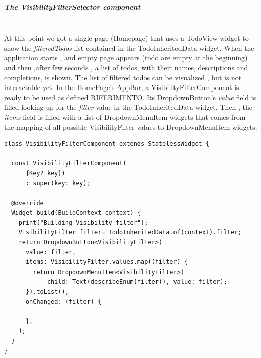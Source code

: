 \subparagraph{The VisibilityFilterSelector component}\mbox{}\\
\label{subpar:todo_app_inherited_widget_visibilityfiltercomponent_component}
At this point we got a single page (Homepage) that uses a TodoView widget to show the \textit{filteredTodos} list contained in the TodoInheritedData widget. When the application starts , and empty page appears (todo are empty at the beginning) and then ,after few seconds , a list of todos, with their names, descriptions and completions, is shown. The list of filtered todos can be visualized , but is not interactable yet. 
In the HomePage’s AppBar, a VisibilityFilterComponent is ready to be used as defined RIFERIMENTO. Its DropdownButton’s \textit{value} field is filled looking up for the \textit{filter} value in the TodoInheritedData widget. Then , the \textit{items} field is filled with a list of DropdownMenuItem widgets that comes from the mapping of all possible VisibilityFilter values to DropdownMenuItem widgets.
\mbox{}\\
\begin{code}

 \mbox{}

\begin{verbatim}
class VisibilityFilterComponent extends StatelessWidget {

  const VisibilityFilterComponent(
      {Key? key})
      : super(key: key);

  @override
  Widget build(BuildContext context) {
    print("Building Visibility filter");
    VisibilityFilter filter= TodoInheritedData.of(context).filter;
    return DropdownButton<VisibilityFilter>(
      value: filter,
      items: VisibilityFilter.values.map((filter) {
        return DropdownMenuItem<VisibilityFilter>(
            child: Text(describeEnum(filter)), value: filter);
      }).toList(),
      onChanged: (filter) {
        
      },
    );
  }
}
\end{verbatim}
\end{code}
\mbox{}\\
